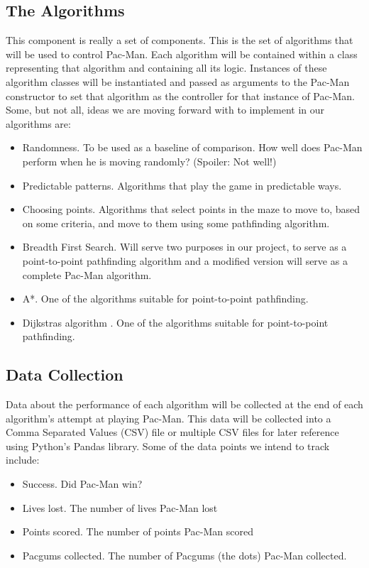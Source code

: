 \documentclass[12pt]{article}
\begin{document}
    \subsection*{The Algorithms}
      This component is really a set of components. This is the set of algorithms that will be used to control Pac-Man. Each algorithm will be contained within a class representing that algorithm and containing all its logic. Instances of these algorithm classes will be instantiated and passed as arguments to the Pac-Man constructor to set that algorithm as the controller for that instance of Pac-Man. Some, but not all, ideas we are moving forward with to implement in our algorithms are:
      \begin{itemize}
        \itemsep-4pt
          \item Randomness. To be used as a baseline of comparison. How well does Pac-Man perform when he is moving randomly? (Spoiler: Not well!)
          \item Predictable patterns. Algorithms that play the game in predictable ways.
          \item Choosing points. Algorithms that select points in the maze to move to, based on some criteria, and move to them using some pathfinding algorithm.
          \item Breadth First Search. Will serve two purposes in our project, to serve as a point-to-point pathfinding algorithm and a modified version will serve as a complete Pac-Man algorithm.
          \item A*. One of the algorithms suitable for point-to-point pathfinding.
          \item Dijkstras algorithm . One of the algorithms suitable for point-to-point pathfinding.
      \end{itemize}
    \subsection*{Data Collection}
      Data about the performance of each algorithm will be collected at the end of each algorithm's attempt at playing Pac-Man. This data will be collected into a Comma Separated Values (CSV) file or multiple CSV files for later reference using Python's Pandas library. Some of the data points we intend to track include:
      \begin{itemize}
        \itemsep-4pt
        \item Success. Did Pac-Man win?
        \item Lives lost. The number of lives Pac-Man lost
        \item Points scored. The number of points Pac-Man scored
        \item Pacgums collected. The number of Pacgums (the dots) Pac-Man collected.
      \end{itemize}
\end{document}
